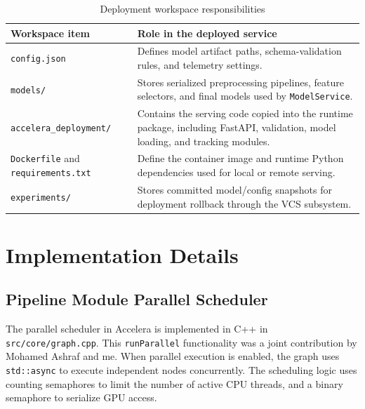 \documentclass[12pt,a4paper,oneside]{report}
\newcommand{\systemname}{Accelera}
\newcommand{\modulepath}[1]{\texttt{#1}}
\begin{document}
\begin{table}[H]
\centering
\small
\caption{Deployment workspace responsibilities}
\label{tab:deployment-workspace-contract-individual}
\begin{tabularx}{\textwidth}{p{}X}
\toprule
\textbf{Workspace item} & \textbf{Role in the deployed service} \\
\midrule
\modulepath{config.json} &
Defines model artifact paths, schema-validation rules, and telemetry settings. \\
\midrule
\modulepath{models/} &
Stores serialized preprocessing pipelines, feature selectors, and final models used by \modulepath{ModelService}. \\
\midrule
\modulepath{accelera\_deployment/} &
Contains the serving code copied into the runtime package, including FastAPI, validation, model loading, and tracking modules. \\
\midrule
\modulepath{Dockerfile} and \modulepath{requirements.txt} &
Define the container image and runtime Python dependencies used for local or remote serving. \\
\midrule
\modulepath{experiments/} &
Stores committed model/config snapshots for deployment rollback through the VCS subsystem. \\
\bottomrule
\end{tabularx}
\end{table}

\chapter{Implementation Details}
\label{chap:methodology}

\section{Pipeline Module Parallel Scheduler}
The parallel scheduler in \systemname{} is implemented in C++ in \modulepath{src/core/graph.cpp}. This \modulepath{runParallel} functionality was a joint contribution by Mohamed Ashraf and me. When parallel execution is enabled, the graph uses \modulepath{std::async} to execute independent nodes concurrently. The scheduling logic uses counting semaphores to limit the number of active CPU threads, and a binary semaphore to serialize GPU access.
\end{document}
